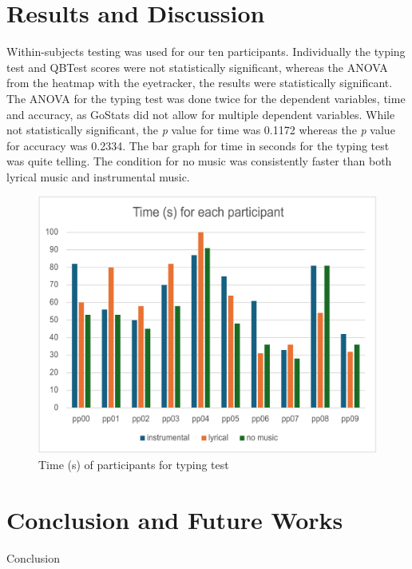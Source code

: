 \documentclass[manuscript, screen, review]{acmart} %
\begin{document}
\section{Results and Discussion}
Within-subjects testing was used for our ten participants. Individually the typing test and QBTest scores were not statistically significant, whereas 
the ANOVA from the heatmap with the eyetracker, the results were statistically significant. %
The ANOVA for the typing test was done twice for the dependent variables, time and accuracy, as GoStats did not allow for multiple 
dependent variables. 
While not statistically significant, the \textit{p} value for time was 0.1172 whereas the \textit{p} value for accuracy was 0.2334.
The bar graph for time in seconds for the typing test was quite telling. The condition for no music was consistently faster than both
lyrical music and instrumental music.

\begin{figure}
  \centering
  \includegraphics[width=\textwidth]{time}
  \caption{Time (s) of participants for typing test}
  \label{time}
\end{figure}

\section{Conclusion and Future Works}
Conclusion



\end{document}
